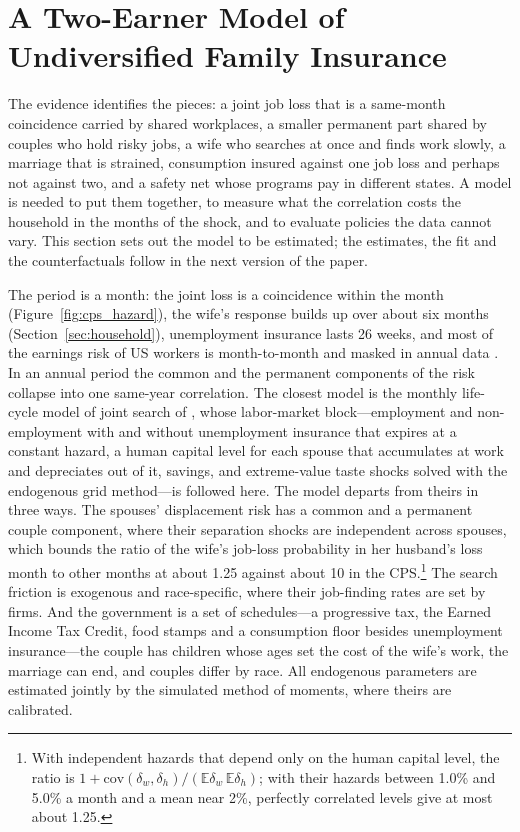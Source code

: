 \section{A Two-Earner Model of Undiversified Family Insurance}\label{sec:model}

\providecommand{\E}{\mathbb{E}}

The evidence identifies the pieces: a joint job loss that is a same-month coincidence carried by shared workplaces, a
smaller permanent part shared by couples who hold risky jobs, a wife who searches at once and finds work slowly, a
marriage that is strained, consumption insured against one job loss and perhaps not against two, and a safety net
whose programs pay in different states. A model is needed to put them together, to measure what the correlation costs
the household in the months of the shock, and to evaluate policies the data cannot vary. This section sets out the
model to be estimated; the estimates, the fit and the counterfactuals follow in the next version of the paper.

The period is a month: the joint loss is a coincidence within the month (Figure~\ref{fig:cps_hazard}), the wife's
response builds up over about six months (Section~\ref{sec:household}), unemployment insurance lasts 26 weeks, and
most of the earnings risk of US workers is month-to-month and masked in annual data \citep{ganong2026earnings}. In an
annual period the common and the permanent components of the risk collapse into one same-year correlation. The
closest model is the monthly life-cycle model of joint search of \citet{bacher2025joint}, whose labor-market
block---employment and non-employment with and without unemployment insurance that expires at a constant hazard, a
human capital level for each spouse that accumulates at work and depreciates out of it, savings, and extreme-value
taste shocks solved with the endogenous grid method---is followed here. The model departs from theirs in three ways.
The spouses' displacement risk has a common and a permanent couple component, where their separation shocks are
independent across spouses, which bounds the ratio of the wife's job-loss probability in her husband's loss month to
other months at about 1.25 against about 10 in the CPS.\footnote{With independent hazards that depend only on the
human capital level, the ratio is $1 + \mathrm{cov}(\delta_w, \delta_h)/(\E\delta_w\,\E\delta_h)$; with their hazards
between 1.0\% and 5.0\% a month and a mean near 2\%, perfectly correlated levels give at most about 1.25.} The search
friction is exogenous and race-specific, where their job-finding rates are set by firms. And the government is a set
of schedules---a progressive tax, the Earned Income Tax Credit, food stamps and a consumption floor besides
unemployment insurance---the couple has children whose ages set the cost of the wife's work, the marriage can end, and
couples differ by race. All endogenous parameters are estimated jointly by the simulated method of moments, where
theirs are calibrated.

